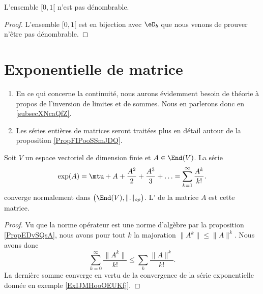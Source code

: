 \begin{corollary}
    L'ensemble \( \mathopen[ 0 , 1 [\) n'est pas dénombrable.
\end{corollary}

\begin{proof}
    L'ensemble \( \mathopen[ 0 , 1 [\) est en bijection avec \( \eD_b\) que nous venons de prouver n'être pas dénombrable.
\end{proof}

\section{Exponentielle de matrice}
\label{secAOnIwQM}

\begin{enumerate}
    \item
        En ce qui concerne la continuité, nous aurons évidemment besoin de théorie à propos de l'inversion de limites et de sommes. Nous en parlerons donc en \ref{subsecXNcaQfZ}.
    \item 
        Les séries entières de matrices seront traitées plus en détail autour de la proposition \ref{PropFIPooSSmJDQ}.
\end{enumerate}

\begin{proposition}     \label{PropPEDSooAvSXmY}
    Soit \( V\) un espace vectoriel de dimension finie et \( A\in\End(V)\). La série
    \begin{equation}
        \exp(A)=\mtu+A+\frac{ A^2 }{ 2 }+\frac{ A^3 }{ 3 }+\ldots =\sum_{k=1}^{\infty}\frac{ A^k }{ k! }.
    \end{equation}
    converge normalement dans \( \big( \End(V),\| . \|_{op} \big)\).  L' de la matrice \( A\) est cette matrice.
\end{proposition}

\begin{proof}
    Vu que la norme opérateur est une norme d'algèbre par la proposition \ref{PropEDvSQsA}, nous avons pour tout \( k\) la majoration \( \| A^k \|\leq \| A \|^k\). Nous avons donc
    \begin{equation}
        \sum_{k=0}^{\infty}\frac{ \| A^k \| }{ k! }\leq \sum_k\frac{ \| A \|^k }{ k! }.
    \end{equation}
    La dernière somme converge en vertu de la convergence de la série exponentielle donnée en exemple \ref{ExIJMHooOEUKfj}.
\end{proof}

